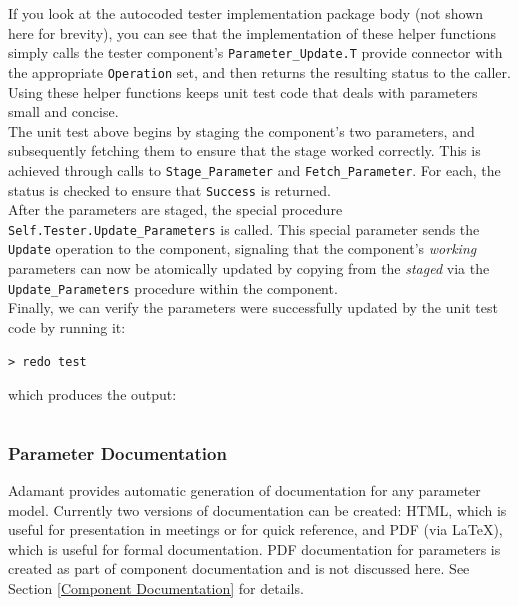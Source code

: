 If you look at the autocoded tester implementation package body (not shown here for brevity), you can see that the implementation of these helper functions simply calls the tester component's \texttt{Parameter\_Update.T} provide connector with the appropriate \texttt{Operation} set, and then returns the resulting status to the caller. Using these helper functions keeps unit test code that deals with parameters small and concise. \\

The unit test above begins by staging the component's two parameters, and subsequently fetching them to ensure that the stage worked correctly. This is achieved through calls to \texttt{Stage\_Parameter} and \texttt{Fetch\_Parameter}. For each, the status is checked to ensure that \texttt{Success} is returned. \\

After the parameters are staged, the special procedure \texttt{Self.Tester.Update\_Parameters} is called. This special parameter sends the \texttt{Update} operation to the component, signaling that the component's \textit{working} parameters can now be atomically updated by copying from the \textit{staged} via the \texttt{Update\_Parameters} procedure within the component. \\

Finally, we can verify the parameters were successfully updated by the unit test code by running it:

\vspace{5mm} %
\begin{verbatim}
> redo test
\end{verbatim}
\vspace{5mm} %

which produces the output:

\vspace{5mm} %
\inputminted{text}{../example_architecture/parameter_component/test/output.txt}
\vspace{5mm} %

\subsubsection{Parameter Documentation}

Adamant provides automatic generation of documentation for any parameter model. Currently two versions of documentation can be created: HTML, which is useful for presentation in meetings or for quick reference, and PDF (via \LaTeX), which is useful for formal documentation. PDF documentation for parameters is created as part of component documentation and is not discussed here. See Section \ref{Component Documentation} for details. \\

